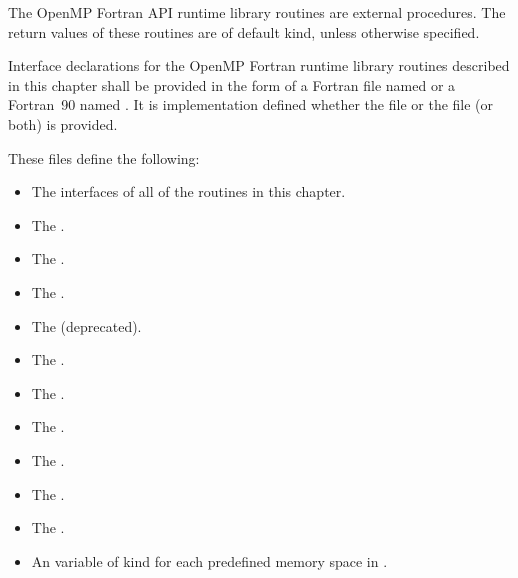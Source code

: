 \begin{fortranspecific}
The OpenMP Fortran API runtime library routines are external procedures. The return
values of these routines are of default kind, unless otherwise specified.

Interface declarations for the OpenMP Fortran runtime library routines described in this
chapter shall be provided in the form of a Fortran  file named  or
a Fortran~90  named . It is implementation defined whether the
 file or the  file (or both) is provided.

These files define the following:

\begin{itemize}
\item The interfaces of all of the routines in this chapter.

\item The   .

\item The   .

\item The   .

\item The    (deprecated).

\item The   .

\item The   .

\item The   .

\item The   .

\item The   .

\item The   .

\item An   variable of kind  for each predefined memory space in .


\end{itemize}
\end{fortranspecific}
